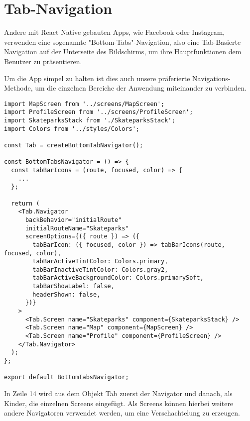 \section{Tab-Navigation}
Andere mit React Native gebauten Apps, wie Facebook oder Instagram, verwenden eine sogenannte
"Bottom-Tabs"{}-Navigation, also eine Tab-Basierte Navigation auf der Unterseite des Bildschirms, um
ihre Hauptfunktionen dem Benutzer zu präsentieren.

Um die App simpel zu halten ist dies auch unsere präferierte Navigations-Methode, um die einzelnen
Bereiche der Anwendung miteinander zu verbinden.

\begin{lstlisting}
import MapScreen from '../screens/MapScreen';
import ProfileScreen from '../screens/ProfileScreen';
import SkateparksStack from './SkateparksStack';
import Colors from '../styles/Colors';

const Tab = createBottomTabNavigator();

const BottomTabsNavigator = () => {
  const tabBarIcons = (route, focused, color) => {
    ...
  };

  return (
    <Tab.Navigator
      backBehavior="initialRoute"
      initialRouteName="Skateparks"
      screenOptions={({ route }) => ({
        tabBarIcon: ({ focused, color }) => tabBarIcons(route, focused, color),
        tabBarActiveTintColor: Colors.primary,
        tabBarInactiveTintColor: Colors.gray2,
        tabBarActiveBackgroundColor: Colors.primarySoft,
        tabBarShowLabel: false,
        headerShown: false,
      })}
    >
      <Tab.Screen name="Skateparks" component={SkateparksStack} />
      <Tab.Screen name="Map" component={MapScreen} />
      <Tab.Screen name="Profile" component={ProfileScreen} />
    </Tab.Navigator>
  );
};

export default BottomTabsNavigator;
\end{lstlisting}

In Zeile 14 wird aus dem Objekt Tab zuerst der Navigator und danach, als Kinder, die einzelnen
Screens eingefügt. Als Screens können hierbei weitere andere Navigatoren verwendet werden, um eine
Verschachtelung zu erzeugen.


